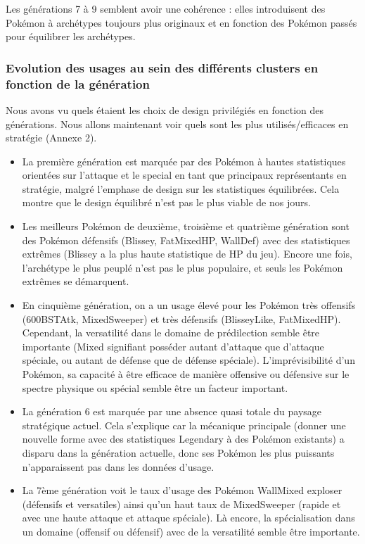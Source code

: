 \documentclass[a4paper,12pt]{article}
\begin{document}
Les générations 7 à 9 semblent avoir une cohérence : elles introduisent des Pokémon à archétypes toujours plus originaux et en fonction des Pokémon passés pour équilibrer les archétypes.

\subsubsection{Evolution des usages au sein des différents clusters en fonction de la génération}

Nous avons vu quels étaient les choix de design privilégiés en fonction des générations. Nous allons maintenant voir quels sont les plus utilisés/efficaces en stratégie (Annexe 2).


\begin{itemize}
    \item La première génération est marquée par des Pokémon à hautes statistiques orientées sur l'attaque et le special en tant que principaux représentants en stratégie, malgré l'emphase de design sur les statistiques équilibrées. Cela montre que le design équilibré n'est pas le plus viable de nos jours.
    \item Les meilleurs Pokémon de deuxième, troisième et quatrième génération sont des Pokémon défensifs (Blissey, FatMixedHP, WallDef) avec des statistiques extrêmes (Blissey a la plus haute statistique de HP du jeu). Encore une fois, l'archétype le plus peuplé n'est pas le plus populaire, et seuls les Pokémon extrêmes se démarquent.
    \item En cinquième génération, on a un usage élevé pour les Pokémon très offensifs (600BSTAtk, MixedSweeper) et très défensifs (BlisseyLike, FatMixedHP). Cependant, la versatilité dans le domaine de prédilection semble être importante (Mixed signifiant posséder autant d'attaque que d'attaque spéciale, ou autant de défense que de défense spéciale). L'imprévisibilité d'un Pokémon, sa capacité à être efficace de manière offensive ou défensive sur le spectre physique ou spécial semble être un facteur important.
    \item La génération 6 est marquée par une absence quasi totale du paysage stratégique actuel. Cela s'explique car la mécanique principale (donner une nouvelle forme avec des statistiques Legendary à des Pokémon existants) a disparu dans la génération actuelle, donc ses Pokémon les plus puissants n'apparaissent pas dans les données d'usage.
    \item La 7ème génération voit le taux d'usage des Pokémon WallMixed exploser (défensifs et versatiles) ainsi qu'un haut taux de MixedSweeper (rapide et avec une haute attaque et attaque spéciale). Là encore, la spécialisation dans un domaine (offensif ou défensif) avec de la versatilité semble être importante.

\end{itemize}
\end{document}
